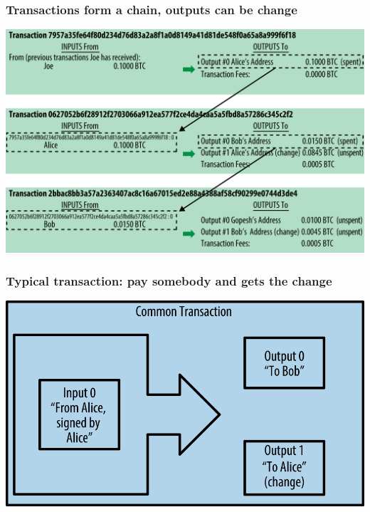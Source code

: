 \documentclass[11pt]{beamer}  %
\begin{document}
\begin{frame}\frametitle{Transactions form a chain, outputs can be change}

  \begin{center}
    \includegraphics[scale=0.23,clip=false]{pictures/mbc2_0204.png}
  \end{center}

\end{frame}

\begin{frame}\frametitle{Typical transaction: pay somebody and gets the change}

  \begin{center}
    \includegraphics[scale=1.2,clip=false]{pictures/mbc2_0205.png}
  \end{center}

\end{frame}
\end{document}
